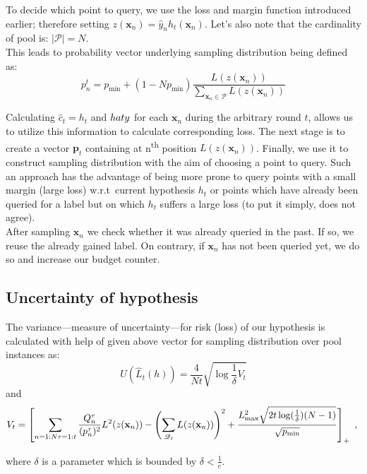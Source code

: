 \documentclass[12pt, a4paper, pdflatex, leqno, twoside]{report}
\newcommand{\ts}{\textsuperscript}
\begin{document}
To decide which point to query, we use the loss and margin 
function introduced earlier; therefore setting $z(\mathbf{x}_n) = \hat{y}_n h_t(\mathbf{x}_n)$. 
Let's also note that the cardinality of pool is: $|\mathscr{P}| = N$.\\
This leads to probability vector underlying sampling distribution being defined 
as:
$$
p_n^t = p_{\text{min}} + (1-Np_{\text{min}}) 
\frac{L(z(\mathbf{x}_n))}{\sum_{\mathbf{x}_n \in \mathscr{P}} L(z(\mathbf{x}_n))}
$$

Calculating $\hat{c}_t = h_t$ and $\\hat{y}$ for each $\mathbf{x}_n$ during the 
arbitrary round $t$, allows us to utilize this information to calculate 
corresponding loss. The next stage is to create a vector $\mathbf{p}_t$ 
containing at n\ts{th} position $L(z(\mathbf{x}_n))$. Finally, we use it to 
construct sampling distribution with the aim of choosing a point to query. Such an approach has 
the advantage of being more prone to query points with a small margin (large loss) 
w.r.t\ current hypothesis $h_t$ or points which have already been queried for a 
label but on which $h_t$ suffers a large loss (to put it simply, does not agree).\\

After sampling $\mathbf{x}_n$ we check whether it was already queried in the 
past. If so, we reuse the already gained label. On contrary, if $\mathbf{x}_n$ has 
not been queried yet, we do so and increase our budget counter.


\subsection{Uncertainty of hypothesis\label{sec:uncertanity}}
The variance---measure of uncertainty---for risk (loss) of our hypothesis 
is calculated with help of given above vector for sampling distribution 
over pool instances as:
\begin{equation}\label{eq:variance}
U(\hat{L}_t(h)) = \frac{4}{Nt} \sqrt{\log\frac{1}{\delta}V_t}
\end{equation}
and
$$
V_t = \left[
\sum_{n = 1:N \\ \tau = 1:t} \frac{Q^\tau_n}{(p^\tau_n)^2} L^2(z(\mathbf{x}_n))
-
\left( \sum_{\mathscr{Q}_t} L(z(\mathbf{x}_n)) \right)^2
+
\frac{L^2_{\text{max}}  \sqrt{2t \log(\frac{1}{\delta}) (N-1)} } 
{\sqrt{p_{\text{min}}}}
\right]_+ \text{~,~}
$$

where $\delta$ is a parameter which is bounded by $\delta < \frac{1}{e}$.\\
\end{document}
